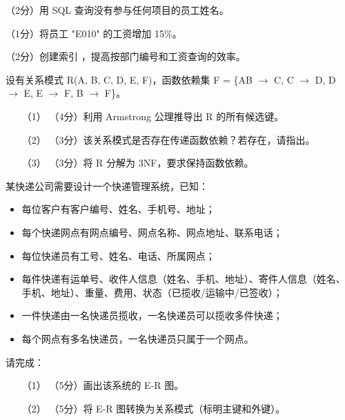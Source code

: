 \documentclass[a4paper,11pt]{article}
\begin{document}
\q （2分）用 SQL 查询没有参与任何项目的员工姓名。
\anslines{0.8cm}

\q （1分）将员工 "E010" 的工资增加 15\%。
\anslines{0.8cm}

\q （2分）创建索引 ，提高按部门编号和工资查询的效率。
\anslines{0.8cm}


\q 设有关系模式 R(A, B, C, D, E, F)，函数依赖集 F = \{AB $\rightarrow$ C, C $\rightarrow$ D, D $\rightarrow$ E, E $\rightarrow$ F, B $\rightarrow$ F\}。
\begin{enumerate}[leftmargin=2em, itemsep=3pt]
  \item[（1）] （4分）利用 Armstrong 公理推导出 R 的所有候选键。
  \item[（2）] （3分）该关系模式是否存在传递函数依赖？若存在，请指出。
  \item[（3）] （3分）将 R 分解为 3NF，要求保持函数依赖。
\end{enumerate}
\anslines{4cm}


\q 某快递公司需要设计一个快递管理系统，已知：
\begin{itemize}
  \item 每位客户有客户编号、姓名、手机号、地址；
  \item 每个快递网点有网点编号、网点名称、网点地址、联系电话；
  \item 每位快递员有工号、姓名、电话、所属网点；
  \item 每件快递有运单号、收件人信息（姓名、手机、地址）、寄件人信息（姓名、手机、地址）、重量、费用、状态（已揽收/运输中/已签收）；
  \item 一件快递由一名快递员揽收，一名快递员可以揽收多件快递；
  \item 每个网点有多名快递员，一名快递员只属于一个网点。
\end{itemize}
请完成：
\begin{enumerate}[leftmargin=2em, itemsep=3pt]
  \item[（1）] （5分）画出该系统的 E-R 图。
  \item[（2）] （5分）将 E-R 图转换为关系模式（标明主键和外键）。
\end{enumerate}
\anslines{5cm}

\end{document}
